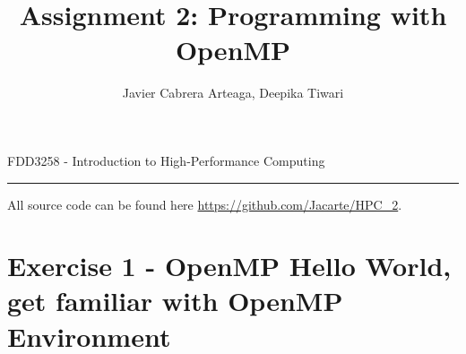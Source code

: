 \documentclass[12pt]{article}
\begin{document}
 
 
\title{Assignment 2: Programming with OpenMP} %
\author{Javier Cabrera Arteaga, Deepika Tiwari} %
 
\maketitle

{%
\centering
FDD3258 - Introduction to High-Performance Computing
\par
}
\hrule
\vspace{.2in}


All source code can be found here \url{https://github.com/Jacarte/HPC\_2}.

\section{Exercise 1 - OpenMP Hello World, get familiar with OpenMP Environment}
\end{document}
